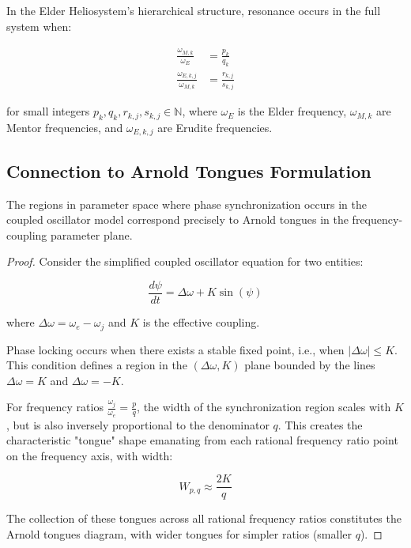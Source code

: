 \begin{corollary}
In the Elder Heliosystem's hierarchical structure, resonance occurs in the full system when:

\begin{align}
\frac{\omega_{M,k}}{\omega_E} &= \frac{p_k}{q_k} \\
\frac{\omega_{E,k,j}}{\omega_{M,k}} &= \frac{r_{k,j}}{s_{k,j}}
\end{align}

for small integers $p_k, q_k, r_{k,j}, s_{k,j} \in \mathbb{N}$, where $\omega_E$ is the Elder frequency, $\omega_{M,k}$ are Mentor frequencies, and $\omega_{E,k,j}$ are Erudite frequencies.
\end{corollary}

\subsection{Connection to Arnold Tongues Formulation}

\begin{theorem}
The regions in parameter space where phase synchronization occurs in the coupled oscillator model correspond precisely to Arnold tongues in the frequency-coupling parameter plane.
\end{theorem}

\begin{proof}
Consider the simplified coupled oscillator equation for two entities:

\begin{equation}
\frac{d\psi}{dt} = \Delta\omega + K\sin(\psi)
\end{equation}

where $\Delta\omega = \omega_e - \omega_j$ and $K$ is the effective coupling.

Phase locking occurs when there exists a stable fixed point, i.e., when $|\Delta\omega| \leq K$. This condition defines a region in the $(\Delta\omega, K)$ plane bounded by the lines $\Delta\omega = K$ and $\Delta\omega = -K$.

For frequency ratios $\frac{\omega_j}{\omega_e} = \frac{p}{q}$, the width of the synchronization region scales with $K$, but is also inversely proportional to the denominator $q$. This creates the characteristic "tongue" shape emanating from each rational frequency ratio point on the frequency axis, with width:

\begin{equation}
W_{p,q} \approx \frac{2K}{q}
\end{equation}

The collection of these tongues across all rational frequency ratios constitutes the Arnold tongues diagram, with wider tongues for simpler ratios (smaller $q$).
\end{proof}

